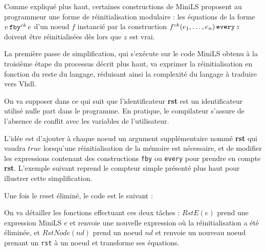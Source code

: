 \documentclass[a4paper]{article}
\newcommand{\minils}{{\sc MiniLS}}
\newcommand{\vhdl}{{\sc Vhdl}}
\newcommand{\mybox}[1]{\mbox{\tt{#1}}}
\newcommand{\Fby}[2]{#1 \, \mybox{fby}^{ck} \, #2}
\newcommand{\Every}[4]{#1^{ck}(#2,\dots,#3) \, \mybox{every} \, #4}
\begin{document}
Comme expliqu\'e plus haut, certaines constructions de \minils{} proposent au
programmeur une forme de r\'einitialisation modulaire : les \'equations de la
forme $\Fby{v}{e}$ d'un noeud $f$ instanci\'e par la construction
$\Every{f}{e_1}{e_n}{z}$ doivent \^etre r\'einitialis\'ees d\`es lors que $z$
est vrai.

La premi\`ere passe de simplification, qui s'ex\'ecute sur le code \minils{}
obtenu \`a la troisi\`eme \'etape du processus d\'ecrit plus haut, va exprimer
la r\'einitialisation en fonction du reste du langage, r\'eduisant ainsi la
complexit\'e du langage \`a traduire vers \vhdl{}.

On va supposer dans ce qui suit que l'identificateur \textbf{rst} est un
identificateur utilis\'e nulle part dans le programme. En pratique, le compilateur
s'assure de l'absence de conflit avec les variables de l'utilisateur.

L'id\'ee est d'ajouter \`a chaque noeud un argument suppl\'ementaire nomm\'e
\textbf{rst} qui vaudra $true$ lorsqu'une r\'einitialisation de la m\'emoire est
n\'ecessaire, et de modifier les expressions contenant des constructions
\texttt{fby} ou \texttt{every} pour prendre en compte \textbf{rst}. L'exemple
suivant reprend le compteur simple pr\'esent\'e plus haut pour illustrer cette
simplification.



Une fois le reset \'elimin\'e, le code est le suivant :



On va d\'etailler les fonctions effectuant ces deux t\^aches : $RstE(e)$ prend
une expression \minils{} $e$ et renvoie une nouvelle expression o\`u la
r\'einitialisation a \'et\'e \'elimin\'ee, et $RstNode(nd)$ prend un noeud $nd$
et renvoie un nouveau noeud prenant un \texttt{rst} \`a un noeud et transforme
ses \'equations.

\newcommand{\re}[1]{RstE(#1)}
\newcommand{\rstn}[1]{RstNode(#1)}
\end{document}

